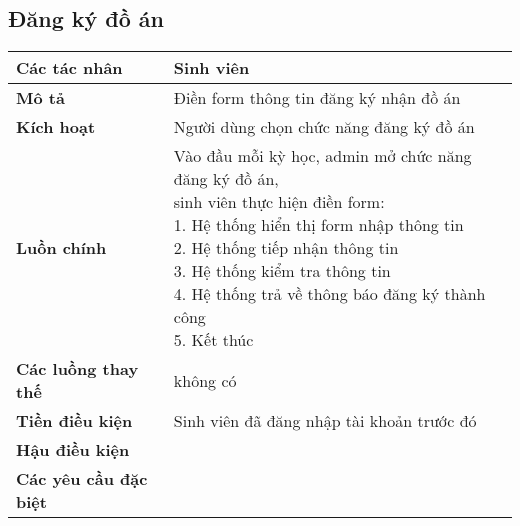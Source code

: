 \subsection{Đăng ký đồ án}
\begin{tabular}{|l|p{}|}
	\hline
	\textbf{Các tác nhân}         & Sinh viên                                                                                         \\
	\hline
	\textbf{Mô tả}                & Điền form thông tin đăng ký nhận đồ án                                                            \\
	\hline
	\textbf{Kích hoạt}            & Người dùng chọn chức năng đăng ký đồ án                                                           \\
	\hline
	\textbf{Luồn chính}           & \makecell[l]{Vào đầu mỗi kỳ học, admin mở chức năng đăng ký đồ án, \\sinh viên thực hiện điền form: \\ 1. Hệ thống hiển thị form nhập thông tin \\ 2. Hệ thống tiếp nhận thông tin \\ 3. Hệ thống kiểm tra thông tin \\ 4. Hệ thống trả về thông báo đăng ký thành công \\ 5. Kết thúc} \\
	\hline
	\textbf{Các luồng thay thế}   & không có                                                                                          \\
	\hline
	\textbf{Tiền điều kiện}       & Sinh viên đã đăng nhập tài khoản trước đó                                                         \\
	\hline
	\textbf{Hậu điều kiện}        &                                                                                                   \\
	\hline
	\textbf{Các yêu cầu đặc biệt} &                                                                                                   \\
	\hline
\end{tabular}

